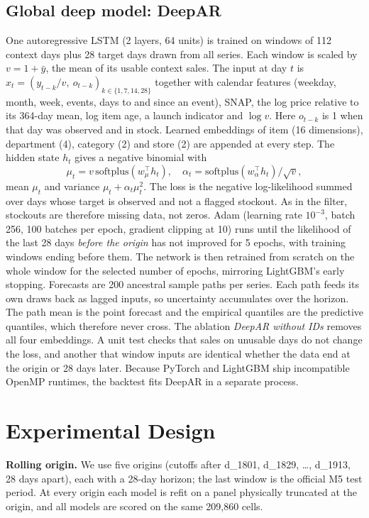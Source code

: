 \documentclass[conference]{IEEEtran}
\begin{document}
\subsection{Global deep model: DeepAR}
One autoregressive LSTM (2 layers, 64 units) is trained on windows of 112 context days plus 28 target days drawn from all series. Each window is scaled by $v=1+\bar y$, the mean of its usable context sales. The input at day $t$ is $x_t=(y_{t-k}/v,\ o_{t-k})_{k\in\{1,7,14,28\}}$ together with calendar features (weekday, month, week, events, days to and since an event), SNAP, the log price relative to its 364-day mean, log item age, a launch indicator and $\log v$. Here $o_{t-k}$ is 1 when that day was observed and in stock. Learned embeddings of item (16 dimensions), department (4), category (2) and store (2) are appended at every step. The hidden state $h_t$ gives a negative binomial with
\begin{equation}
\mu_t = v\,\mathrm{softplus}(w_\mu^\top h_t),\quad \alpha_t = \mathrm{softplus}(w_\alpha^\top h_t)/\sqrt{v},
\end{equation}
mean $\mu_t$ and variance $\mu_t+\alpha_t\mu_t^2$. The loss is the negative log-likelihood summed over days whose target is observed and not a flagged stockout. As in the filter, stockouts are therefore missing data, not zeros. Adam (learning rate $10^{-3}$, batch 256, 100 batches per epoch, gradient clipping at 10) runs until the likelihood of the last 28 days \emph{before the origin} has not improved for 5 epochs, with training windows ending before them. The network is then retrained from scratch on the whole window for the selected number of epochs, mirroring LightGBM's early stopping. Forecasts are 200 ancestral sample paths per series. Each path feeds its own draws back as lagged inputs, so uncertainty accumulates over the horizon. The path mean is the point forecast and the empirical quantiles are the predictive quantiles, which therefore never cross. The ablation \emph{DeepAR without IDs} removes all four embeddings. A unit test checks that sales on unusable days do not change the loss, and another that window inputs are identical whether the data end at the origin or 28 days later. Because PyTorch and LightGBM ship incompatible OpenMP runtimes, the backtest fits DeepAR in a separate process.

\section{Experimental Design}
\textbf{Rolling origin.} We use five origins (cutoffs after d\_1801, d\_1829, \dots, d\_1913, 28 days apart), each with a 28-day horizon; the last window is the official M5 test period. At every origin each model is refit on a panel physically truncated at the origin, and all models are scored on the same 209{,}860 cells.
\end{document}
